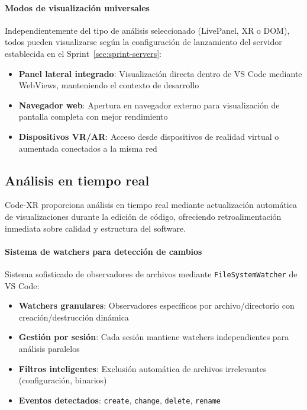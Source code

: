 \documentclass[a4paper, 12pt]{book}
\begin{document}
\paragraph{Modos de visualización universales}
Independientemente del tipo de análisis seleccionado (LivePanel, XR o DOM), todos pueden visualizarse según la configuración de lanzamiento del servidor establecida en el Sprint~\ref{sec:sprint-servers}:

\begin{itemize}
  \item \textbf{Panel lateral integrado}: Visualización directa dentro de VS Code mediante WebViews, manteniendo el contexto de desarrollo
  \item \textbf{Navegador web}: Apertura en navegador externo para visualización de pantalla completa con mejor rendimiento
  \item \textbf{Dispositivos VR/AR}: Acceso desde dispositivos de realidad virtual o aumentada conectados a la misma red
\end{itemize}


\subsection{Análisis en tiempo real}
\label{sec:analisis-tiempo-real}

Code-XR proporciona análisis en tiempo real mediante actualización automática de visualizaciones durante la edición de código, ofreciendo retroalimentación inmediata sobre calidad y estructura del software.

\paragraph{Sistema de watchers para detección de cambios}
Sistema sofisticado de observadores de archivos mediante \texttt{FileSystemWatcher} de VS Code:

\begin{itemize}
  \item \textbf{Watchers granulares}: Observadores específicos por archivo/directorio con creación/destrucción dinámica
  \item \textbf{Gestión por sesión}: Cada sesión mantiene watchers independientes para análisis paralelos
  \item \textbf{Filtros inteligentes}: Exclusión automática de archivos irrelevantes (configuración, binarios)
  \item \textbf{Eventos detectados}: \texttt{create}, \texttt{change}, \texttt{delete}, \texttt{rename}
\end{itemize}
\end{document}

